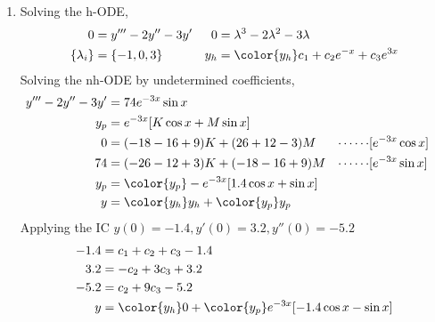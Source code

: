 \begin{enumerate}
    \item Solving the h-ODE,
          \begin{align}
              0               & = y''' - 2y'' - 3y'                         &
              0               & = \lambda^{3} - 2\lambda^{2} - 3\lambda       \\
              \{\lambda_{i}\} & = \{-1, 0, 3\}                              &
              y_{h}           & = \color{y_h} c_1 + c_2 e^{-x} + c_3 e^{3x}
          \end{align}
          Solving the nh-ODE by undetermined coefficients,
          \begin{align}
              y''' - 2y'' - 3y' & = 74e^{-3x}\sin x                             \\
              y_{p}             & = e^{-3x}[K\cos x + M\sin x]                  \\
              0                 & = (-18 - 16 + 9)K + (26 + 12 - 3)M          &
              \cdots\cdots      & [e^{-3x}\cos x]                               \\
              74                & = (-26 - 12 + 3)K + (-18 - 16 + 9)M         &
              \cdots\cdots      & [e^{-3x}\sin x]                               \\
              y_{p}             & = \color{y_p} -e^{-3x}[1.4\cos x + \sin x]    \\
              y                 & = {\color{y_h} y_{h}} + {\color{y_p} y_{p}}
          \end{align}
          Applying the IC $ y(0) = -1.4, y'(0) = 3.2, y''(0) = -5.2 $
          \begin{align}
              -1.4 & = c_1 + c_2 + c_3 - 1.4                                        \\
              3.2  & = -c_2 + 3c_3 + 3.2                                            \\
              -5.2 & = c_2 + 9c_3 - 5.2                                             \\
              y    & = {\color{y_h} 0} + {\color{y_p} e^{-3x}[-1.4\cos x - \sin x]}
          \end{align}
          \begin{figure}[H]
              \centering
              \begin{tikzpicture}[
                      declare function = {
                              y_p = e^(-3*x)*(-1.4*cos(x) - sin(x));
                              y_h = 0;
                          }
                  ]

\end{tikzpicture}
\end{figure}
\end{enumerate}
